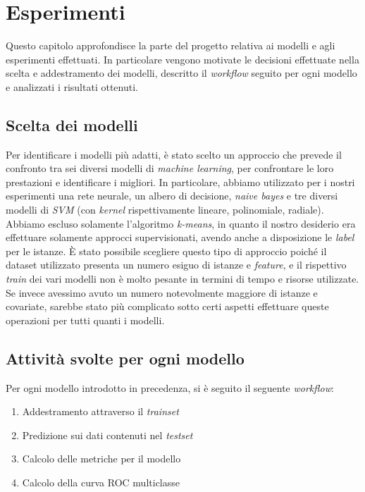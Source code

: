 \section{Esperimenti}
    Questo capitolo approfondisce la parte del progetto relativa ai modelli e agli esperimenti effettuati. In particolare vengono motivate le decisioni effettuate nella scelta e addestramento dei modelli, descritto il \textit{workflow} seguito per ogni modello e analizzati i risultati ottenuti.
    
    \subsection{Scelta dei modelli}
        Per identificare i modelli più adatti, è stato scelto un approccio che prevede il confronto tra sei diversi modelli di \textit{machine learning}, per confrontare le loro prestazioni e identificare i migliori. In particolare, abbiamo utilizzato per i nostri esperimenti una rete neurale, un albero di decisione, \textit{naive bayes} e tre diversi modelli di \textit{SVM} (con \textit{kernel} rispettivamente lineare, polinomiale, radiale). Abbiamo escluso solamente l'algoritmo \textit{k-means}, in quanto il nostro desiderio era effettuare solamente approcci supervisionati, avendo anche a disposizione le \textit{label} per le istanze. È stato possibile scegliere questo tipo di approccio poiché il dataset utilizzato presenta un numero esiguo di istanze e \textit{feature}, e il rispettivo \textit{train} dei vari modelli non è molto pesante in termini di tempo e risorse utilizzate. Se invece avessimo avuto un numero notevolmente maggiore di istanze e covariate, sarebbe stato più complicato sotto certi aspetti effettuare queste operazioni per tutti quanti i modelli.
        
    \subsection{Attività svolte per ogni modello}
        Per ogni modello introdotto in precedenza, si è seguito il seguente \textit{workflow}:
        \begin{enumerate}
            \item Addestramento attraverso il \textit{trainset} 
            \item Predizione sui dati contenuti nel \textit{testset}
            \item Calcolo delle metriche per il modello
            \item Calcolo della curva ROC multiclasse
        \end{enumerate}
        
